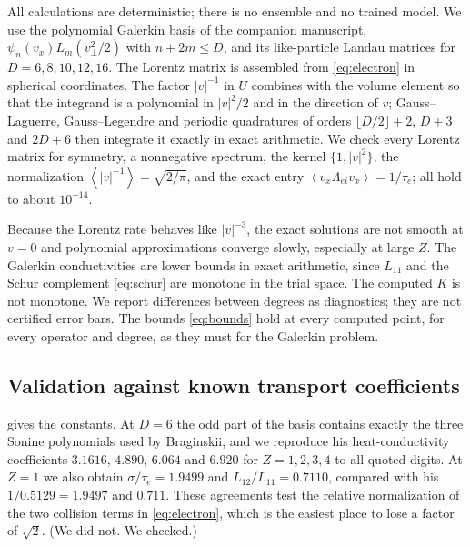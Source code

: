 \documentclass[11pt]{article}
\newcommand{\av}[1]{\left\langle #1\right\rangle}
\newcommand{\kap}{\kappa}
\theoremstyle{definition}
\theoremstyle{remark}
\numberwithin{equation}{section}
\begin{document}
All calculations are deterministic; there is no ensemble and no trained
model. We use the polynomial Galerkin basis of the companion manuscript,
$\psi_n(v_x)L_m(v_\perp^2/2)$ with $n+2m\leq D$, and its like-particle
Landau matrices for $D=6,8,10,12,16$. The Lorentz matrix is assembled
from \eqref{eq:electron} in spherical coordinates. The factor $|v|^{-1}$
in $U$ combines with the volume element so that the integrand is a
polynomial in $|v|^2/2$ and in the direction of $v$; Gauss--Laguerre,
Gauss--Legendre and periodic quadratures of orders
$\lfloor D/2\rfloor+2$, $D+3$ and $2D+6$ then integrate it exactly in
exact arithmetic. We check every Lorentz matrix for symmetry, a
nonnegative spectrum, the kernel $\{1,|v|^2\}$, the normalization
$\av{|v|^{-1}}=\sqrt{2/\pi}$, and the exact entry
$\av{v_x\Lambda_{ei}v_x}=1/\tau_e$; all hold to about $10^{-14}$.

Because the Lorentz rate behaves like $|v|^{-3}$, the exact solutions are
not smooth at $v=0$ and polynomial approximations converge slowly,
especially at large $Z$. The Galerkin conductivities are lower bounds in
exact arithmetic, since $L_{11}$ and the Schur complement \eqref{eq:schur}
are monotone in the trial space. The computed $K$ is not monotone. We
report differences between degrees as diagnostics; they are not
certified error bars. The bounds \eqref{eq:bounds} hold at every computed
point, for every operator and degree, as they must for the Galerkin
problem.

\subsection{Validation against known transport coefficients}

\begin{table}[tb]
\centering
\caption{Electron transport coefficients versus ion charge, with
$\kap$ and $\sigma=L_{11}$ in units of $\tau_e$ and subscripts giving the
degree $D$. The column ``Brag.'' quotes Braginskii's coefficient
$\gamma_0$ \cite{Braginskii1965}. The last three columns give the leading
deficit coefficient in units of $\lambda_e^2$ and in normalized form.}
\label{tab:electron}
\small

\end{table}

 gives the constants. At $D=6$ the odd part of the
basis contains exactly the three Sonine polynomials used by Braginskii,
and we reproduce his heat-conductivity coefficients $3.1616$, $4.890$,
$6.064$ and $6.920$ for $Z=1,2,3,4$ to all quoted digits. At $Z=1$ we
also obtain $\sigma/\tau_e=1.9499$ and $L_{12}/L_{11}=0.7110$, compared
with his $1/0.5129=1.9497$ and $0.711$. These agreements test the relative
normalization of the two collision terms in \eqref{eq:electron}, which is
the easiest place to lose a factor of $\sqrt2$. (We did not. We checked.)
\end{document}
